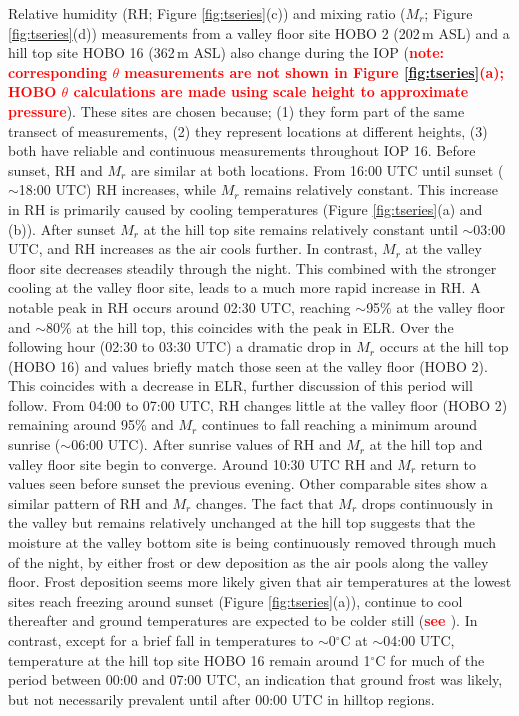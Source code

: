 \documentclass[times]{qjrms4}
\begin{document}
Relative humidity (RH; Figure \ref{fig:tseries}(c)) and mixing ratio ($M_r$; Figure \ref{fig:tseries}(d)) measurements from a valley floor site HOBO 2 (202$\,\mbox{m}$ ASL) and a hill top site HOBO 16 (362$\,\mbox{m}$ ASL) also change during the IOP (\textcolor{red}{\bf note: corresponding $\theta$ measurements are not shown in Figure \ref{fig:tseries}(a); HOBO $\theta$ calculations are made using scale height to approximate pressure}). These sites are chosen because; (1) they form part of the same transect of measurements, (2) they represent locations at different heights, (3) both have reliable and continuous measurements throughout IOP 16. Before sunset, RH and $M_r$ are similar at both locations. From 16:00 UTC until sunset ($\sim$18:00 UTC) RH increases, while $M_r$ remains relatively constant. This increase in RH is primarily caused by cooling temperatures (Figure \ref{fig:tseries}(a) and (b)). After sunset $M_r$ at the hill top site remains relatively constant until $\sim$03:00 UTC, and RH increases as the air cools further. In contrast, $M_r$ at the valley floor site decreases steadily through the night. This combined with the stronger cooling at the valley floor site, leads to a much more rapid increase in RH. A notable peak in RH occurs around 02:30 UTC, reaching $\sim$95\% at the valley floor and $\sim$80\% at the hill top, this coincides with the peak in ELR. Over the following hour (02:30 to 03:30 UTC) a dramatic drop in $M_r$ occurs at the hill top (HOBO 16) and values briefly match those seen at the valley floor (HOBO 2). This coincides with a decrease in ELR, further discussion of this period will follow. From 04:00 to 07:00 UTC, RH changes little at the valley floor (HOBO 2) remaining around 95\% and $M_r$ continues to fall reaching a minimum around sunrise ($\sim$06:00 UTC). After sunrise values of RH and $M_r$ at the hill top and valley floor site begin to converge. Around 10:30 UTC RH and $M_r$ return to values seen before sunset the previous evening. Other comparable sites show a similar pattern of RH and $M_r$ changes. The fact that $M_r$ drops continuously in the valley but remains relatively unchanged at the hill top suggests that the moisture at the valley bottom site is being continuously removed through much of the night, by either frost or dew deposition as the air pools along the valley floor. Frost deposition seems more likely given that air temperatures at the lowest sites reach freezing around sunset (Figure \ref{fig:tseries}(a)), continue to cool thereafter and ground temperatures are expected to be colder still (\textcolor{red}{\bf see \citet{Vosper2013narrow}}). In contrast, except for a brief fall in temperatures to $\sim$0$^{\circ}$C at $\sim$04:00 UTC, temperature at the hill top site HOBO 16 remain around 1$^\circ$C for much of the period between 00:00 and 07:00 UTC, an indication that ground frost was likely, but not necessarily prevalent until after 00:00 UTC in hilltop regions.
\end{document}
